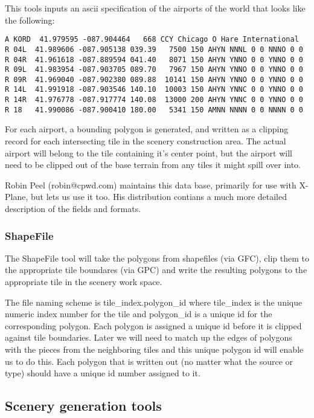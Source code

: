 \documentclass[12pt]{article}
\begin{document}
This tools inputs an ascii specification of the airports of the world
that looks like the following:

\begin{verbatim}
A KORD  41.979595 -087.904464   668 CCY Chicago O Hare International 
R 04L  41.989606 -087.905138 039.39   7500 150 AHYN NNNL 0 0 NNNO 0 0
R 04R  41.961618 -087.889594 041.40   8071 150 AHYN YNNO 0 0 YNNO 0 0
R 09L  41.983954 -087.903705 089.70   7967 150 AHYN YNNO 0 0 YNNO 0 0
R 09R  41.969040 -087.902380 089.88  10141 150 AHYN YNNO 0 0 YNNO 0 0
R 14L  41.991918 -087.903546 140.10  10003 150 AHYN YNNC 0 0 YNNO 0 0
R 14R  41.976778 -087.917774 140.08  13000 200 AHYN YNNC 0 0 YNNO 0 0
R 18   41.990086 -087.900410 180.00   5341 150 AMNN NNNN 0 0 NNNN 0 0
\end{verbatim}

For each airport, a bounding polygon is generated, and written as a
clipping record for each intersecting tile in the scenery construction
area.  The actual airport will belong to the tile containing it's
center point, but the airport will need to be clipped out of the base
terrain from any tiles it might spill over into.

Robin Peel (robin@cpwd.com) maintains this data base, primarily for
use with X-Plane, but lets us use it too.  His distribution contians a
much more detailed description of the fields and formats.

\subsubsection{ShapeFile}

The ShapeFile tool will take the polygons from shapefiles (via GFC),
clip them to the appropriate tile boundares (via GPC) and write the
resulting polygons to the appropriate tile in the scenery work space.

The file naming scheme is tile\_index.polygon\_id where tile\_index is
the unique numeric index number for the tile and polygon\_id is a
unique id for the corresponding polygon.  Each polygon is assigned a
unique id before it is clipped against tile boundaries.  Later we will
need to match up the edges of polygons with the pieces from the
neighboring tiles and this unique polygon id will enable us to do
this.  Each polygon that is written out (no matter what the source or
type) should have a unique id number assigned to it.

\subsection{Scenery generation tools}
\end{document}
